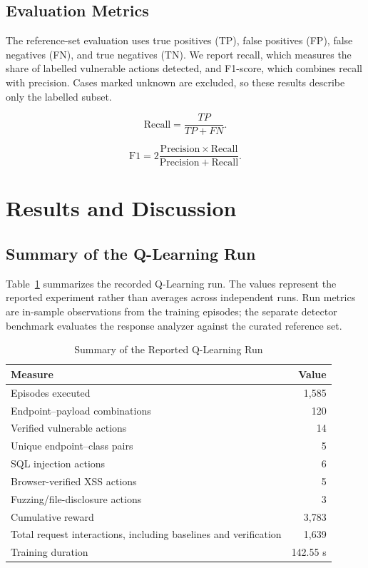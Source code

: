 \documentclass[conference]{IEEEtran}
\begin{document}
\subsection{Evaluation Metrics}

The reference-set evaluation uses true positives (TP),
false positives (FP), false negatives (FN), and true
negatives (TN). We report recall, which measures the share
of labelled vulnerable actions detected, and F1-score, which
combines recall with precision. Cases marked unknown are
excluded, so these results describe only the labelled subset.

\begin{equation}
\mathrm{Recall} = \frac{TP}{TP+FN}.
\label{eq:recall}
\end{equation}

\begin{equation}
\mathrm{F1} =
2\frac{\mathrm{Precision}\times\mathrm{Recall}}
{\mathrm{Precision}+\mathrm{Recall}}.
\label{eq:f1}
\end{equation}

\section{Results and Discussion}

\subsection{Summary of the Q-Learning Run}

Table~\ref{tab:run-summary} summarizes the recorded
Q-Learning run. The values represent the reported
experiment rather than averages across independent runs.
Run metrics are in-sample observations from the training
episodes; the separate detector benchmark evaluates the
response analyzer against the curated reference set.

\begin{table}[!t]
\caption{Summary of the Reported Q-Learning Run}
\label{tab:run-summary}
\centering
\footnotesize
\begin{tabular}{p{}r}
\toprule
\textbf{Measure} & \textbf{Value}\\
\midrule
Episodes executed & 1,585\\
Endpoint--payload combinations & 120\\
Verified vulnerable actions & 14\\
Unique endpoint--class pairs & 5\\
SQL injection actions & 6\\
Browser-verified XSS actions & 5\\
Fuzzing/file-disclosure actions & 3\\
Cumulative reward & 3,783\\
Total request interactions, including baselines and verification & 1,639\\
Training duration & 142.55 s\\
\bottomrule
\end{tabular}
\end{table}
\end{document}
